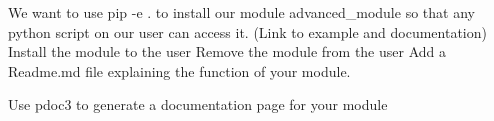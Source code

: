 \documentclass[]{erlangen-problemset}
\begin{document}
\begin{problem}[title={Making our module installable with pip}]
\noindent
\Question We want to use pip -e . to install our module advanced\_module so that any python script on our user can access it. (Link to example and documentation)
\Question Install the module to the user
\Question Remove the module from the user
\Question Add a Readme.md file explaining the function of your module.
\end{problem}

\begin{problem}[title={Generating documentation for your module}]
\noindent
\Question Use pdoc3 to generate a documentation page for your module
\end{problem}
\end{document}
